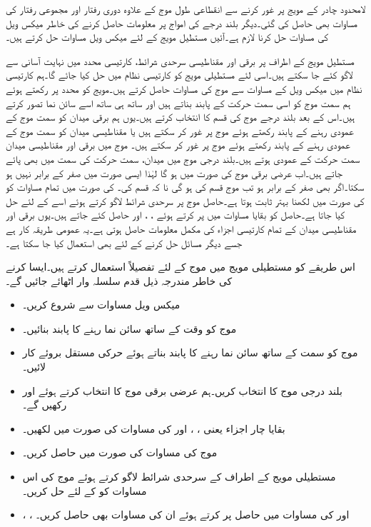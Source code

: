 لامحدود چادر کے مویج پر غور کرنے سے انقطاعی طول موج کے علاوہ دوری رفتار اور مجموعی رفتار کی مساوات بھی حاصل کی  گئی۔دیگر بلند درجے کی امواج پر معلومات حاصل کرنے کی خاطر میکس ویل کی مساوات حل کرنا لازم ہے۔آئیں  مستطیل مویج کے لئے میکس ویل مساوات حل کرتے ہیں۔

مستطیل مویج کے اطراف پر برقی اور مقناطیسی سرحدی شرائط، کارتیسی محدد میں نہایت آسانی سے لاگو کئے جا سکتے ہیں۔اسی لئے مستطیلی مویج کو کارتیسی نظام میں حل کیا جائے گا۔ہم کارتیسی نظام میں میکس ویل کے مساوات سے  موج کی مساوات حاصل کرتے ہیں۔مویج کو  محدد پر رکھتے ہوئے ہم سمت موج کو اسی سمت حرکت کے پابند بناتے ہیں اور ساتھ ہی ساتھ اسے سائن نما تصور کرتے ہیں۔اس کے بعد بلند درجے موج کی قسم کا انتخاب کرتے ہیں۔یوں ہم برقی میدان  کو سمت موج کے عمودی رہنے کے پابند رکھتے ہوئے   موج پر غور کر سکتے ہیں یا مقناطیسی میدان کو سمت موج کے عمودی رہنے کے پابند رکھتے ہوئے   موج پر غور کر سکتے ہیں۔ موج میں برقی اور مقناطیسی میدان سمت حرکت کے عمودی ہوتے ہیں۔بلند درجی موج میں میدان، سمت حرکت کی سمت میں بھی پائے جاتے ہیں۔اب عرضی برقی  موج کی صورت میں  ہو گا لہٰذا ایسی صورت میں  صفر کے برابر نہیں ہو سکتا۔اگر  بھی صفر کے برابر ہو تب موج  قسم کی ہو گی نا کہ  قسم کی۔ کی صورت میں تمام مساوات کو  کی صورت میں لکھنا بہتر ثابت ہوتا ہے۔حاصل موج پر سرحدی شرائط لاگو کرتے ہوئے اسے  کے لئے حل کیا جاتا ہے۔حاصل  کو بقایا مساوات میں پر کرتے ہوئے ، ،  اور  حاصل کئے جاتے ہیں۔یوں برقی اور مقناطیسی میدان کے تمام کارتیسی اجزاء کی مکمل معلومات حاصل ہوتی ہے۔یہ عمومی طریقہ کار ہے جسے دیگر مسائل حل کرنے کے لئے بھی استعمال کیا جا سکتا ہے۔

اس طریقے کو مستطیلی مویج میں  موج کے لئے تفصیلاً  استعمال کرتے ہیں۔ایسا کرنے کی خاطر مندرجہ ذیل قدم سلسلہ وار اٹھائے جائیں گے۔
\begin{itemize}\label{اقدام_مویج_آٹھ_قدم}
\item
میکس ویل مساوات سے شروع کریں۔
\item
موج کو وقت کے ساتھ سائن نما رہنے کا پابند بنائیں۔
\item
موج کو  سمت کے ساتھ سائن نما رہنے کا پابند بناتے ہوئے  حرکی مستقل بروئے کار لائیں۔
\item
بلند درجی موج کا انتخاب کریں۔ہم  عرضی برقی  موج کا انتخاب کرتے ہوئے  اور  رکھیں گے۔
\item
بقایا چار اجزاء یعنی ، ،  اور  کی مساوات  کی صورت میں لکھیں۔
\item
موج کی مساوات  کی صورت میں حاصل کریں۔
\item
مستطیلی مویج کے اطراف کے سرحدی شرائط لاگو کرتے ہوئے موج کی اس مساوات کو  کے لئے حل کریں۔
\item
{}، ،  اور  کی مساوات میں حاصل  پر کرتے ہوئے ان کی مساوات بھی حاصل کریں۔
\end{itemize}  


